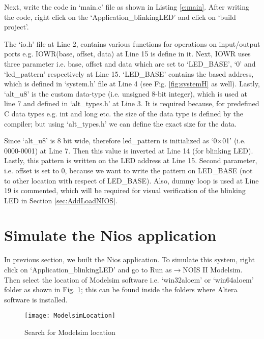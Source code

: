 Next, write the code in `main.c' file as shown in Listing \ref{c:main}. After writing the code, right click on the `Application\_blinkingLED' and click on `build project'. 

\begin{explanation}
	The `io.h' file at Line 2, contains various functions for operations on input/output ports e.g. IOWR(base, offset, data) at Line 15 is define in it. Next, IOWR uses three parameter i.e. base, offset and data which are set to `LED\_BASE', `0' and `led\_pattern' respectively at Line 15. `LED\_BASE' contains the based address, which is defined in `system.h' file at Line 4 (see Fig. \ref{fig:systemH} as well). Lastly, `alt\_u8' is the custom data-type (i.e. unsigned 8-bit integer), which is used at line 7 and defined in `alt\_types.h' at Line 3. It is required because, for predefined C data types e.g. int and long etc. the size of the data type is defined by the compiler; but using `alt\_types.h' we can define the exact size for the data.  
	
	Since `alt\_u8' is 8 bit wide, therefore led\_pattern is initialized as `0$\times$01' (i.e. 0000-0001) at Line 7. Then this value is inverted at Line 14 (for blinking LED). Lastly, this pattern is written on the LED address at Line 15. Second parameter, i.e. offset is set to 0, because we want to write the pattern on LED\_BASE (not to other location with respect of LED\_BASE). Also, dummy loop is used at Line 19 is commented, which will be required for visual verification of the blinking LED in Section \ref{sec:AddLoadNIOS}.
\end{explanation}


\section{Simulate the Nios application}\label{sec:SimulateNios}
In previous section, we built the Nios application. To simulate this system, right click on `Application\_blinkingLED' and go to Run as$\rightarrow$NOIS II Modelsim. Then select the location of Modelsim software i.e. `win32aloem' or `win64aloem' folder as shown in Fig. \ref{fig:ModelsimLocation}; this can be found inside the folders where Altera software is installed. 
	\begin{figure}[!h]
		\centering
		\texttt{[image: ModelsimLocation]}
		\caption{Search for Modelsim location}
		\label{fig:ModelsimLocation}
	\end{figure}


